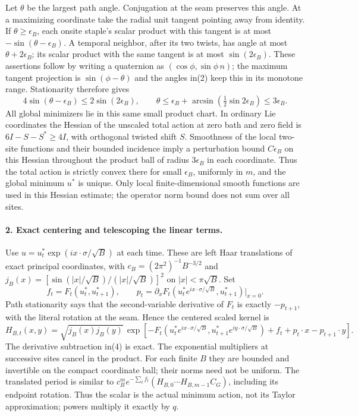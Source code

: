\documentclass[11pt]{article}
\begin{document}
Let $\theta$ be the largest path angle. Conjugation at the seam preserves this
angle. At a maximizing coordinate take the radial unit tangent pointing away
from identity. If $\theta\ge\epsilon_B$, each onsite staple's scalar product
with this tangent is at most $-\sin(\theta-\epsilon_B)$. A temporal neighbor,
after its two twists, has angle at most $\theta+2\epsilon_B$; its scalar product
with the same tangent is at most $\sin(2\epsilon_B)$. These assertions follow
by writing a quaternion as $(\cos\phi,\sin\phi\,n)$; the maximum tangent
projection is $\sin(\phi-\theta)$ and the angles in(2) keep this in its
monotone range. Stationarity therefore gives
\[
 4\sin(\theta-\epsilon_B)\le2\sin(2\epsilon_B),\qquad
 \theta\le\epsilon_B+\arcsin(\tfrac12\sin2\epsilon_B)\le3\epsilon_B.       \tag{3}
\]
All global minimizers lie in this same small product chart. In ordinary Lie
coordinates the Hessian of the unscaled total action at zero bath and zero
field is $6I-S-S^*\ge4I$, with orthogonal twisted shift $S$. Smoothness of the
local two-site functions and their bounded incidence imply a perturbation
bound $C\epsilon_B$ on this Hessian throughout the product ball of radius
$3\epsilon_B$ in each coordinate. Thus the total action is strictly convex
there for small $\epsilon_B$, uniformly in $m$, and the global minimum $u^*$
is unique. Only local finite-dimensional smooth functions are used in this
Hessian estimate; the operator norm bound does not sum over all sites.

\paragraph{2. Exact centering and telescoping the linear terms.}
Use $u=u_t^*\exp(i x\cdot\sigma/\sqrt B)$ at each time. These are left Haar
translations of exact principal coordinates, with
$c_B=(2\pi^2)^{-1}B^{-3/2}$ and
$j_B(x)=[\sin(|x|/\sqrt B)/(|x|/\sqrt B)]^2$ on $|x|<\pi\sqrt B$.
Set
\[
 f_t=F_t(u_t^*,u_{t+1}^*),\qquad
 p_t=\partial_x F_t(u_t^*e^{ix\cdot\sigma/\sqrt B},u_{t+1}^*)|_{x=0}.
\]
Path stationarity says that the second-variable derivative of $F_t$ is exactly
$-p_{t+1}$, with the literal rotation at the seam. Hence the centered scaled
kernel is
\[
 H_{B,t}(x,y)=\sqrt{j_B(x)j_B(y)}\,
 \exp[-F_t(u_t^*e^{ix\cdot\sigma/\sqrt B},u_{t+1}^*e^{iy\cdot\sigma/\sqrt B})
       +f_t+p_t\cdot x-p_{t+1}\cdot y].                                  \tag{4}
\]
The derivative subtraction in(4) is exact. The exponential multipliers at
successive sites cancel in the product. For each finite $B$ they are bounded
and invertible on the compact coordinate ball; their norms need not be
uniform. The translated period is similar to
$c_B^m e^{-\sum_t f_t}(H_{B,0}\cdots H_{B,m-1}C_G)$, including its endpoint
rotation. Thus the scalar is the actual minimum action, not its Taylor
approximation; powers multiply it exactly by $q$.
\end{document}

